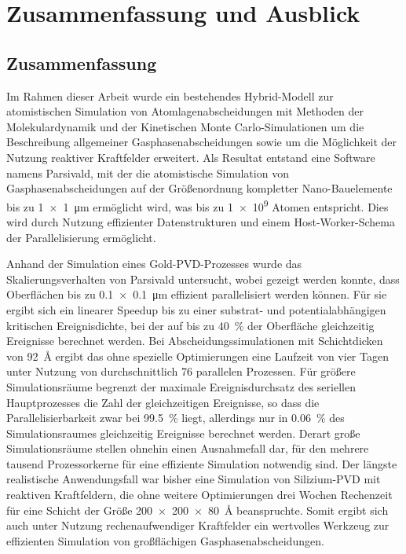 \chapter{Zusammenfassung und Ausblick}
\label{summary}


\section{Zusammenfassung}

Im Rahmen dieser Arbeit wurde ein bestehendes Hybrid-Modell zur atomistischen Simulation von Atomlagenabscheidungen mit Methoden der Molekulardynamik und der Kinetischen Monte Carlo-Simulationen um die Beschreibung allgemeiner Gasphasenabscheidungen sowie um die Möglichkeit der Nutzung reaktiver Kraftfelder erweitert.
Als Resultat entstand eine Software namens Parsivald, mit der die atomistische Simulation von Gasphasenabscheidungen auf der Größenordnung kompletter Nano-Bauelemente bis zu \SI{1x1}{\micro\meter} ermöglicht wird, was bis zu \num{1e9} Atomen entspricht.
Dies wird durch Nutzung effizienter Datenstrukturen und einem Host-Worker-Schema der Parallelisierung ermöglicht.


Anhand der Simulation eines Gold-PVD-Prozesses wurde das Skalierungsverhalten von Parsivald untersucht, wobei gezeigt werden konnte, dass Oberflächen bis zu \SI{0.1x0.1}{\micro\meter} effizient parallelisiert werden können.
Für sie ergibt sich ein linearer Speedup bis zu einer substrat- und potentialabhängigen kritischen Ereignisdichte, bei der auf bis zu \SI{40}{\percent} der Oberfläche gleichzeitig Ereignisse berechnet werden.
Bei Abscheidungssimulationen mit Schichtdicken von \SI{92}{\angstrom} ergibt das ohne spezielle Optimierungen eine Laufzeit von vier Tagen unter Nutzung von durchschnittlich \num{76} parallelen Prozessen.
Für größere Simulationsräume begrenzt der maximale Ereignisdurchsatz des seriellen Hauptprozesses die Zahl der gleichzeitigen Ereignisse, so dass die Parallelisierbarkeit zwar bei \SI{99.5}{\percent} liegt, allerdings nur in \SI{0.06}{\percent} des Simulationsraumes gleichzeitig Ereignisse berechnet werden.
Derart große Simulationsräume stellen ohnehin einen Ausnahmefall dar, für den mehrere tausend Prozessorkerne für eine effiziente Simulation notwendig sind.
Der längste realistische Anwendungsfall war bisher eine Simulation von Silizium-PVD mit reaktiven Kraftfeldern, die ohne weitere Optimierungen drei Wochen Rechenzeit für eine Schicht der Größe \SI{200x200x80}{\angstrom} beanspruchte.
Somit ergibt sich auch unter Nutzung rechenaufwendiger Kraftfelder ein wertvolles Werkzeug zur effizienten Simulation von großflächigen Gasphasenabscheidungen.

